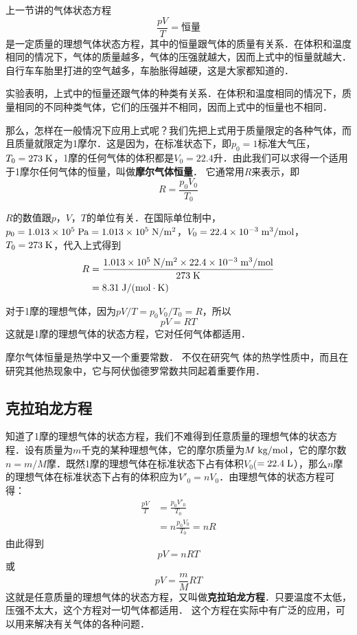 上一节讲的气体状态方程
\[\frac{pV}{T}=\text{恒量} \]
是一定质量的理想气体状态方程，其中的恒量跟气体的质量有关系．在体积和温度相同的情况下，气体的质量越多，气体的压强就越大，因而上式中的恒量就越大．自行车车胎里打进的空气越多，车胎胀得越硬，这是大家都知道的．

实验表明，上式中的恒量还跟气体的种类有关系．在体积和温度相同的情况下，质量相同的不同种类气体，它们的压强并不相同，因而上式中的恒量也不相同．

那么，怎样在一般情况下应用上式呢？我们先把上式用于质量限定的各种气体，而且质量就限定为1摩尔．这是因为，在标准状态下，即$p_0=1$标准大气压，$T_0=273 \;\text{K} $，1摩的任何气体的体积都是$V_0=22.4$升．由此我们可以求得一个适用于1摩尔任何气体的恒量，叫做\textbf{摩尔气体恒量}．
它通常用$R$来表示，即
\[R=\frac{p_0V_0}{T_0} \]

$R$的数值跟$p $，$ V $，$ T$的单位有关．在国际单位制中，$p_0=
1.013\times 10^5 \;\text{Pa}=1.013\times 10^5 \;\text{N}/\text{m}^2$，$V_0=22. 4\times 10^{-3} \;\text{m}^3/\text{mol}$，$T_0=273 \;\text{K} $，代入上式得到
\[\begin{split}
R&=\frac{1.013\times 10^5 \;\text{N}/\text{m}^2 \times  22. 4\times 10^{-3} \;\text{m}^3/\text{mol}}{273\;\text{K} }\\
&=8.31 \;\text{J}/(\text{mol}\cdot\text{K}) 
\end{split} \]

对于1摩的理想气体，因为$pV/T=p_0V_0/T_0=R$，所以
$$pV=RT$$
这就是1摩的理想气体的状态方程，它对任何气体都适用．

摩尔气体恒量是热学中又一个重要常数．
不仅在研究气
体的热学性质中，而且在研究其他热现象中，它与阿伏伽德罗常数共同起着重要作用．

\subsection{克拉珀龙方程} 

知道了1摩的理想气体的状态方程，我们不难得到任意质量的理想气体的状态方程．设有质量为$m$千克的某种理想气体，它的摩尔质量为$M \;\text{kg}/\text{mol} $，它的摩尔数$n=m/M$摩．既然1摩的理想气体在标准状态下占有体积$V_0$($=22.4 \;\text{L} $），那么$n$摩的理想气体在标准状态下占有的体积应为$V'_0=nV_0$．由理想气体的状态方程可得：
\[\begin{split}
\frac{pV}{T}&=\frac{p_0V'_0}{T_0}\\
&=n\frac{p_0V_0}{T_0}=nR
\end{split} \]
由此得到
\[pV=nRT \]
或\[pV=\frac{m}{M}RT \]
这就是任意质量的理想气体的状态方程，又叫做\textbf{克拉珀龙方程}．只要温度不太低，压强不太大，这个方程对一切气体都适用．
这个方程在实际中有广泛的应用，可以用来解决有关气体的各种问题．


